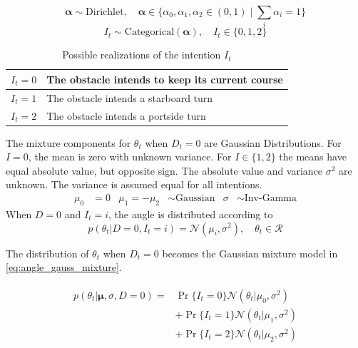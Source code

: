 \begin{equation}
    \boldsymbol{\alpha} \sim \text{Dirichlet}, \quad \boldsymbol{\alpha} \in \{\alpha_0, \alpha_1, \alpha_2 \in (0, 1) \; | \; \sum_i \alpha_i = 1 \}
\end{equation}
\begin{equation}
    I_t \sim \text{Categorical}(\boldsymbol{\alpha}), \quad I_t \in \{0, 1, 2\}
\end{equation}

\begin{table}[h]
\centering
\begin{tabular}{|l|l|}
\hline
$I_t=0$ & The obstacle intends to keep its current course \\ \hline
$I_t=1$ & The obstacle intends a starboard turn           \\ \hline
$I_t=2$ & The obstacle intends a portside turn            \\ \hline
\end{tabular}
\caption{Possible realizations of the intention $I_t$}
\label{tbl:intentions}
\end{table}


The mixture components for $\theta_t$ when $D_t=0$ are Gaussian Distributions. For $I=0$, the mean is zero with unknown variance. For $I \in \{1, 2\}$ the means have equal absolute value, but opposite sign. The absolute value and variance $\sigma^2$ are unknown. The variance is assumed equal for all intentions. 
\begin{align}
    \mu_0 &= 0 &  \mu_{1} = - \mu_{2} &\sim \text{Gaussian} & \sigma &\sim \text{Inv-Gamma}
\end{align}
When $D=0$ and $I_t=i$, the angle is distributed according to
\begin{equation}\label{eq:theta_intention_mixture}
    p(\theta_t | D=0, I_t=i) = \mathcal{N}(\mu_i, \sigma^2), \quad \theta_t \in \mathcal{R}
\end{equation}

The distribution of $\theta_t$ when $D_t=0$ becomes the Gaussian mixture model in \cref{eq:angle_gauss_mixture}.

\begin{align}\label{eq:angle_gauss_mixture}
\begin{split}
    p(\theta_t | \boldsymbol{\mu}, \sigma, D=0) = &\Pr\{I_t=0\}\mathcal{N}(\theta_t | \mu_0, \sigma^2)\\
    &+ \Pr\{I_t=1\}\mathcal{N}(\theta_t | \mu_1, \sigma^2)\\
    &+ \Pr\{I_t=2\}\mathcal{N}(\theta_t | \mu_2, \sigma^2)
\end{split}
\end{align}

